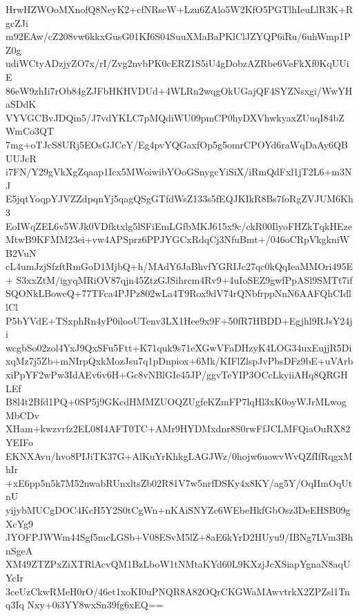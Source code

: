 HrwHZWOoMXnofQ8NeyK2+cfNRseW+Lzu6ZAlo5W2KfO5PGTlhIeuLlR3K+RgcZJi
m92EAw/cZ208vw6kkxGusG01KI6S04SuuXMaBaPKlClJZYQP6iRu/6uhWmp1PZ0g
udiWCtyADzjyZO7x/rI/Zvg2nvbPK0cERZ1S5iU4gDobzAZRbe6VeFkXf0KqUUiE
86eW9zhIi7rOb84gZJFbHKHVDUd+4WLRn2wqgOkUGajQF4SYZNsxgi/WwYHaSDdK
VYVGCBvJDQin5/J7vdYKLC7pMQdiWU09pmCP0hyDXVhwkyaxZUuqI84bZWmCo3QT
7mg+oTJcS8URj5EOsGJCeY/Eg4pvYQGaxfOp5g5omrCPOYd6raWqDaAy6QBUUJcR
i7FN/Y29gVkXgZqaap1Icx5MWoiwibYOoGSnygcYiSiX/iRmQdFxl1jT2L6+m3NJ
E5jqtYoqpYJVZZdpqnYj5qagQSgGTfdWsZ133s5fEQJKIkR8Bs7foRgZVJUM6Kh3
EoIWqZEL6v5WJk0VDfktxlg5lSFiEmLGfbMKJ615x9c/ckR00IlyoFHZkTqkHEze
MtwB9KFMM23ei+vw4APSprz6PPJYGCxRdqCj3NfuBmt+/046oCRpVkgkniWB2VuN
cL4umJzjSfzftRmGoD1MjbQ+h/MAdY6JaBhvfYGRIJc27qc0kQqIeaMMOri495E+
S3xxZtM/igyqMRiOV87qjn45ZtzGJSihrcm4Rv9+4uIoSEZ9gwfPpASl9SMTt7if
SQONkLBoweQ+77TFca4PJPz802wLa4T9Rox9dV74rQNbfrppNnN6AAFQhCIdllCl
P5bYVdE+TSxphRn4yP0ilooUTenv3LX1Hee9x9F+50fR7HBDD+Egjhl9RJsY24ji
wcgbSo02zol4YxJ9QxSFu5Ftt+K71quk9s71eXGwVFaDHzyK4LOG34uxEujjR5Di
xqMz7j5Zb+mNIrpQxkMozJsu7q1pDnpiox+6Mk/KIFlZlspJvPbsDFz9bE+uVArb
xiPpYF2wPw3IdAEv6v6H+Gc8vNBlGIe45JP/ggvTeYIP3OCcLkyiiAHq8QRGHLEf
B8l4t2Bfd1PQ+0SP5j9GKcdHMMZUOQZUgfeKZmFP7lqHl3xK0oyWJrMLwogMbCDv
XHam+kwzvrfz2EL08I4AFT0TC+AMr9HYDMxdnr8S0rwFfJCLMFQiaOuRX82YEIFo
EKNXAvu/hvo8PIJiTK37G+AlKuYrKhkgLAGJWz/0hojw6uowvWvQZfIfRqgxMhIr
+xE6pp5n5k7M52nwabRUnxltsZb02R81V7w5nrfDSKy4x8KY/ag5Y/OqHmOqUtnU
yijybMUCgDOC4KcH5Y2S0tCgWn+nKAiSNYZc6WEbeHkfGbOsz3DeEHSB09gXcYg9
JYOFPJWWm44Sgf5mcLGSb+V08ESvM5lZ+8aE6kYrD2HUyu9/IBNg7LVm3BhnSgeA
XM49ZTZPxZiXTRlAcvQM1BzLboW1tNMtaKYd60L9KXzjJcXSiapYgnaN8aqUYcIr
3ceUzCkwRMeH0rO/46et1xoKI0uPNQR8A82OQrCKGWaMAwvtrkX2ZPZsl1Tnq3Iq
Nxy+0i3YY8wxSn39fg6xEQ==
